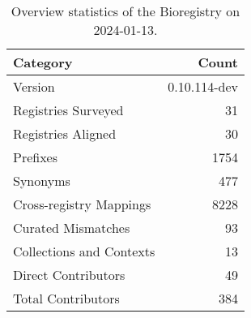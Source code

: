 \begin{table}
\caption{Overview statistics of the Bioregistry on 2024-01-13.}
\label{tab:bioregistry-summary}
\begin{tabular}{lr}
\toprule
Category & Count \\
\midrule
Version & 0.10.114-dev \\
Registries Surveyed & 31 \\
Registries Aligned & 30 \\
Prefixes & 1754 \\
Synonyms & 477 \\
Cross-registry Mappings & 8228 \\
Curated Mismatches & 93 \\
Collections and Contexts & 13 \\
Direct Contributors & 49 \\
Total Contributors & 384 \\
\bottomrule
\end{tabular}
\end{table}
